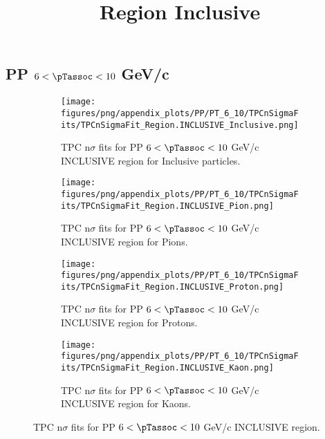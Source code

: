     
            \subsection*{PP $6 < \pTassoc < 10$ GeV/c}
            \begin{figure}[H]
                \title{Region Inclusive}
                \begin{subfigure}[b]{0.5\textwidth}
                    \centering
                    \texttt{[image: figures/png/appendix\_plots/PP/PT\_6\_10/TPCnSigmaFits/TPCnSigmaFit\_Region.INCLUSIVE\_Inclusive.png]}
                    \caption{TPC n$\sigma$ fits for PP $6 < \pTassoc < 10$ GeV/c INCLUSIVE region for Inclusive particles.}
                    \label{fig:appendix_PP_$6 < \pTassoc < 10$ GeV/c_INCLUSIVE_Inclusive}
                \end{subfigure}
                \begin{subfigure}[b]{0.5\textwidth}
                    \centering
                    \texttt{[image: figures/png/appendix\_plots/PP/PT\_6\_10/TPCnSigmaFits/TPCnSigmaFit\_Region.INCLUSIVE\_Pion.png]}
                    \caption{TPC n$\sigma$ fits for PP $6 < \pTassoc < 10$ GeV/c INCLUSIVE region for Pions.}
                    \label{fig:appendix_PP_$6 < \pTassoc < 10$ GeV/c_INCLUSIVE_Pion}
                \end{subfigure}
                \begin{subfigure}[b]{0.5\textwidth}
                    \centering
                    \texttt{[image: figures/png/appendix\_plots/PP/PT\_6\_10/TPCnSigmaFits/TPCnSigmaFit\_Region.INCLUSIVE\_Proton.png]}
                    \caption{TPC n$\sigma$ fits for PP $6 < \pTassoc < 10$ GeV/c INCLUSIVE region for Protons.}
                    \label{fig:appendix_PP_$6 < \pTassoc < 10$ GeV/c_INCLUSIVE_Proton}
                \end{subfigure}
                \begin{subfigure}[b]{0.5\textwidth}
                    \centering
                    \texttt{[image: figures/png/appendix\_plots/PP/PT\_6\_10/TPCnSigmaFits/TPCnSigmaFit\_Region.INCLUSIVE\_Kaon.png]}
                    \caption{TPC n$\sigma$ fits for PP $6 < \pTassoc < 10$ GeV/c INCLUSIVE region for Kaons.}
                    \label{fig:appendix_PP_$6 < \pTassoc < 10$ GeV/c_INCLUSIVE_Kaon}
                \end{subfigure}
                \caption{TPC n$\sigma$ fits for PP $6 < \pTassoc < 10$ GeV/c INCLUSIVE region.}
                \label{fig:appendix_PP_$6 < \pTassoc < 10$ GeV/c_INCLUSIVE}
            \end{figure}

